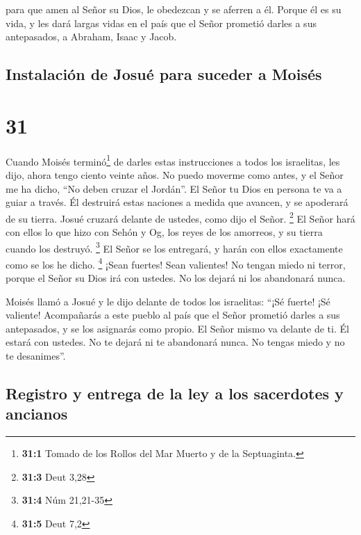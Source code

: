  para que amen al Señor su Dios, le obedezcan y se
aferren a él. Porque él es su vida, y les dará largas vidas en el país
que el Señor prometió darles a sus antepasados, a Abraham, Isaac y
Jacob.

\hypertarget{instalaciuxf3n-de-josuuxe9-para-suceder-a-moisuxe9s}{%
\subsection{Instalación de Josué para suceder a
Moisés}\label{instalaciuxf3n-de-josuuxe9-para-suceder-a-moisuxe9s}}

\hypertarget{section-30}{%
\section{31}\label{section-30}}

 Cuando Moisés terminó\footnote{\textbf{31:1} Tomado de
  los Rollos del Mar Muerto y de la Septuaginta.} de darles estas
instrucciones a todos los israelitas,  les dijo, ahora
tengo ciento veinte años. No puedo moverme como antes, y el Señor me ha
dicho, ``No deben cruzar el Jordán''.  El Señor tu Dios en
persona te va a guiar a través. Él destruirá estas naciones a medida que
avancen, y se apoderará de su tierra. Josué cruzará delante de ustedes,
como dijo el Señor. \footnote{\textbf{31:3} Deut 3,28}  El
Señor hará con ellos lo que hizo con Sehón y Og, los reyes de los
amorreos, y su tierra cuando los destruyó. \footnote{\textbf{31:4} Núm
  21,21-35}  El Señor se los entregará, y harán con ellos
exactamente como se los he dicho. \footnote{\textbf{31:5} Deut 7,2}
 ¡Sean fuertes! Sean valientes! No tengan miedo ni terror,
porque el Señor su Dios irá con ustedes. No los dejará ni los abandonará
nunca.

 Moisés llamó a Josué y le dijo delante de todos los
israelitas: ``¡Sé fuerte! ¡Sé valiente! Acompañarás a este pueblo al
país que el Señor prometió darles a sus antepasados, y se los asignarás
como propio.  El Señor mismo va delante de ti. Él estará
con ustedes. No te dejará ni te abandonará nunca. No tengas miedo y no
te desanimes''.

\hypertarget{registro-y-entrega-de-la-ley-a-los-sacerdotes-y-ancianos}{%
\subsection{Registro y entrega de la ley a los sacerdotes y
ancianos}\label{registro-y-entrega-de-la-ley-a-los-sacerdotes-y-ancianos}}

